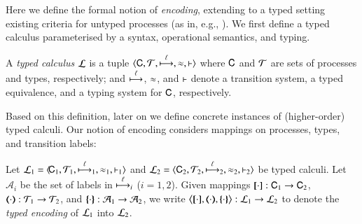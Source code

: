 \noi Here we define the formal notion of \emph{encoding}, 
extending to a typed setting existing criteria for untyped processes (as in, e.g.,
\cite{Nestmann00,Palamidessi03,DBLP:conf/lics/PalamidessiSVV06,DBLP:journals/iandc/Gorla10,DBLP:conf/icalp/LanesePSS10,DBLP:journals/tcs/FuL10}). 
We first define a typed calculus parameterised by a syntax, operational semantics, and typing.

\smallskip 

\begin{definition}\label{d:tcalculus}\rm
A \emph{typed calculus} $\mathcal{L}$ is a tuple
          $\calc{\CAL}{\cal{T}}{\hby{\ell}}{\wb}{\proves}$
	where $\mathsf{C}$ and $\cal{T}$ are sets of processes and types, 
respectively; and $\stackrel{\ell}{\longmapsto}$, $\approx$, and $\vdash$ 
	denote a transition system, a typed equivalence, and a typing system for $\mathsf{C}$, respectively. 
\end{definition}

%
%
%
%

\smallskip 

\noi 
Based on this definition, later on we define concrete instances of (higher-order) typed calculi.
Our notion of encoding considers mappings on processes, 
types, and transition labels: 

\begin{definition}\rm
\label{def:tenc}
        Let  
        $\tyl{L}_1=\calc{\!\CAL_1}{{\cal{T}}_1}{\hby{\ell}_1}{\wb_1}{\proves_1}$
        and
        $\tyl{L}_2=\calc{\CAL_2}{{\cal{T}}_2}{\hby{\ell}_2}{\wb_2}{\proves_2}$
         be typed calculi. 
        Let $\mathcal{A}_{i}$ be the set of labels in $\stackrel{\ell}{\longmapsto}_i$ ($i=1,2$).
	Given mappings $[\!\![\cdot]\!\!]: \mathsf{C}_1 \to \mathsf{C}_2$, 
	$\mapt{\cdot}: {\cal{T}}_1 \to {\cal{T}}_2$, and 
	$\{\!\!\{\cdot\}\!\!\}: \mathcal{A}_1 \to \mathcal{A}_2$, 
	we write 
	$\enco{\map{\cdot}, \mapt{\cdot}, \mapa{\cdot}} : \tyl{L}_1 \to \tyl{L}_2$ to denote the \emph{typed encoding} of $\mathcal{L}_1$ into $\mathcal{L}_2$.
\end{definition}

